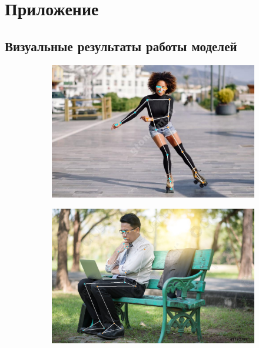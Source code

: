 \section{Приложение}
\label{sec:Appendix} 

\subsection{Визуальные результаты работы моделей}

\begin{figure}[h]
\begin{subfigure}[b]{.5\textwidth}
	\centering
	\includegraphics[width=\textwidth]{./images/MPPose/19}
	\caption{ }
\end{subfigure}
\begin{subfigure}[b]{.5\textwidth}
	\centering
   \includegraphics[width=\textwidth]{./images/MPPose/23}
   \caption{ }

\end{subfigure}
\end{figure}
